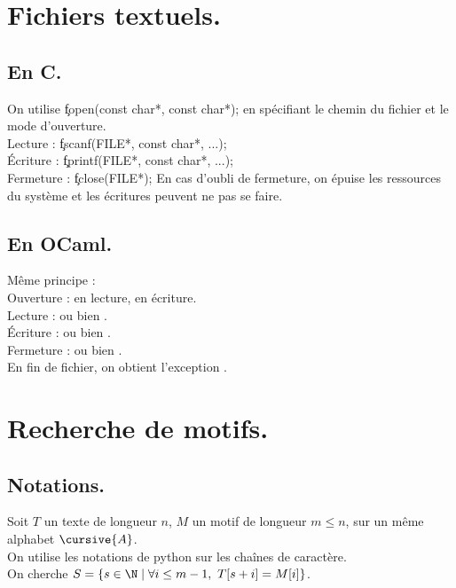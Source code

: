 \documentclass[french, 11pt]{article}
\begin{document}
\section{Fichiers textuels.}
\subsection{En C.}

\begin{defi}{}{}
    On utilise \c{fopen(const char*, const char*);} en spécifiant le chemin du fichier et le mode d'ouverture.\\
    Lecture : \c{fscanf(FILE*, const char*, ...);}\\
    Écriture : \c{fprintf(FILE*, const char*, ...);}\\
    Fermeture : \c{fclose(FILE*);}\n
    En cas d'oubli de fermeture, on épuise les ressources du système et les écritures peuvent ne pas se faire. 
\end{defi}

\subsection{En OCaml.}

\begin{defi}{}{}
    Même principe :\\
    Ouverture :  en lecture,  en écriture.\\
    Lecture :  ou bien .\\
    Écriture :  ou bien .\\
    Fermeture :  ou bien .\\
    En fin de fichier, on obtient l'exception .
\end{defi}

\section{Recherche de motifs.}
\subsection{Notations.}

\begin{nota}{}{}
    Soit $T$ un texte de longueur $n$, $M$ un motif de longueur $m\leq n$, sur un même alphabet $\cursive{A}$.\\
    On utilise les notations de python sur les chaînes de caractère.\\
    On cherche $S=\{s\in\N \mid \forall i \leq m-1, ~ T[s+i]=M[i]\}$.
\end{nota}
\end{document}
